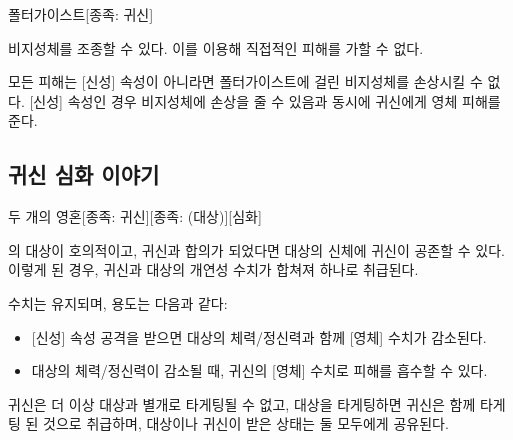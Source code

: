 \documentclass{report}
\begin{document}
	\begin{story}{폴터가이스트}{[종족: 귀신]}
		
		비지성체를 조종할 수 있다. 이를 이용해 직접적인 피해를 가할 수 없다.
		
		모든 피해는 [신성] 속성이 아니라면 폴터가이스트에 걸린 비지성체를 손상시킬 수 없다. [신성] 속성인 경우 비지성체에 손상을 줄 수 있음과 동시에 귀신에게 영체 피해를 준다.
		
	\end{story}
	
	\subsection{귀신 심화 이야기}
	
	\begin{story}{두 개의 영혼}{[종족: 귀신][종족: (대상)][심화]}
		
		의 대상이 호의적이고, 귀신과 합의가 되었다면 대상의 신체에 귀신이 공존할 수 있다. 이렇게 된 경우, 귀신과 대상의 개연성 수치가 합쳐져 하나로 취급된다.
		
		 수치는 유지되며, 용도는 다음과 같다:
		\begin{itemize}
			\item {}[신성] 속성 공격을 받으면 대상의 체력/정신력과 함께 [영체] 수치가 감소된다.
			\item 대상의 체력/정신력이 감소될 때, 귀신의 [영체] 수치로 피해를 흡수할 수 있다.
		\end{itemize}
		
		귀신은 더 이상 대상과 별개로 타게팅될 수 없고, 대상을 타게팅하면 귀신은 함께 타게팅 된 것으로 취급하며, 대상이나 귀신이 받은 상태는 둘 모두에게 공유된다.
		
	\end{story}
\end{document}
